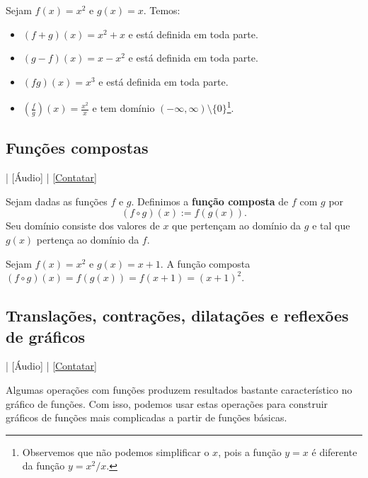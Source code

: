 \begin{ex}
  Sejam $f(x)=x^2$ e $g(x)=x$. Temos:
  \begin{itemize}
  \item $(f+g)(x) = x^2 + x$ e está definida em toda parte.
  \item $(g-f)(x) = x - x^2$ e está definida em toda parte.
  \item $(fg)(x) = x^3$ e está definida em toda parte.
  \item $\left(\frac{f}{g}\right)(x) = \frac{x^2}{x}$ e tem domínio $(-\infty, \infty)\setminus \{0\}$\footnote{Observemos que não podemos simplificar o $x$, pois a função $y=x$ é diferente da função $y=x^2/x$.}.
  \end{itemize}
\end{ex}

\subsection{Funções compostas}

\begin{flushright}
  [Vídeo] | [Áudio] | \href{https://phkonzen.github.io/notas/contato.html}{[Contatar]}
\end{flushright}

Sejam dadas as funções $f$ e $g$. Definimos a {\bf função composta} de $f$ com $g$ por
\begin{equation}
  (f\circ g)(x) := f(g(x)).
\end{equation}
Seu domínio consiste dos valores de $x$ que pertençam ao domínio da $g$ e tal que $g(x)$ pertença ao domínio da $f$.

\begin{ex}
  Sejam $f(x) = x^2$ e $g(x) = x+1$. A função composta $(f\circ g)(x) = f(g(x)) = f(x+1) = (x+1)^2$.
\end{ex}

\subsection{Translações, contrações, dilatações e reflexões de gráficos}

\begin{flushright}
  [Vídeo] | [Áudio] | \href{https://phkonzen.github.io/notas/contato.html}{[Contatar]}
\end{flushright}

Algumas operações com funções produzem resultados bastante característico no gráfico de funções. Com isso, podemos usar estas operações para construir gráficos de funções mais complicadas a partir de funções básicas.

